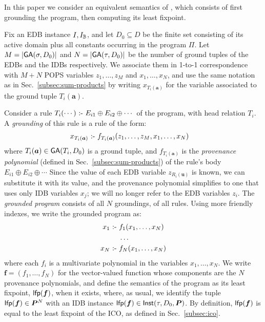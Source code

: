 \label{subsec:grounded:program}

In this paper we consider an equivalent semantics of \datalogo, which
consists of first grounding the program, then computing its least
fixpoint.

Fix an EDB instance $I, I_\mathbb B$, and let $D_0 \subseteq D$ be the finite
set consisting of its active domain plus all constants occurring in
the program $\Pi$.  Let $M = |\textsf{GA}(\sigma,D_0)|$ and
$N = |\textsf{GA}(\tau,D_0)|$ be the number of ground tuples of the EDBs
and the IDBs respectively.  We associate them in 1-to-1 correspondence
with $M+N$ POPS variables $z_1, \ldots, z_M$ and $x_1, \ldots, x_N$,
and use the same notation as in Sec.~\ref{subsec:sum-products} by
writing $x_{T_i(\bm a)}$ for the variable associated to the ground
tuple $T_i(\bm a)$.

Consider a rule $T_i(\cdots) \text{ :- } E_{i1} \oplus E_{i2} \oplus \cdots$
of the \datalogo program, with head relation $T_i$.  A {\em grounding}
of this rule is a rule of the form:
%
\begin{align*}
  x_{T_i(\bm a)} \text{ :- } & f_{T_i(\bm a)}(z_1, \ldots, z_M, x_1, \ldots, x_N)
\end{align*}
%
where $T_i(\bm a) \in \textsf{GA}(T_i,D_0)$ is a ground tuple, and
$f_{T_i(\bm a)}$ is the {\em provenance polynomial} (defined in
Sec.~\ref{subsec:sum-products}) of the rule's body
$E_{i1} \oplus E_{i2} \oplus \cdots$ Since the value of each EDB
variable $z_{R_i(\bm u)}$ is known, we can substitute it with its
value, and the provenance polynomial simplifies to one that uses only
IDB variables $x_j$; we will no longer refer to the EDB variables
$z_i$.  The {\em grounded program} consists of all $N$ groundings, of
all rules.  Using more friendly indexes, we write the grounded program
as:
%
\begin{align}
  x_1 \text{ :- } & f_1(x_1, \ldots, x_N) \nonumber\\
          & \ldots \label{eq:grounded:pi} \\
  x_N \text{ :- } & f_N(x_1, \ldots, x_N) \nonumber
\end{align}
%
where each $f_i$ is a multivariate polynomial in the variables
$x_1, \ldots, x_N$.  We write $\bm f = (f_1, \ldots, f_N)$ for the
vector-valued function whose components are the $N$ provenance
polynomials, and define the semantics of the \datalogo program as its
least fixpoint, $\text{\sf lfp}(\bm f)$, when it exists,
where, as usual, we identify the tuple $\text{\sf lfp}(\bm f) \in \bm P^N$ with
an IDB instance $\text{\sf lfp}(\bm f) \in \textsf{Inst}(\tau,D_0,\bm P)$.  By
definition, $\text{\sf lfp}(\bm f)$ is equal to the least fixpoint of the ICO,
as defined in Sec.~\ref{subsec:ico}.


